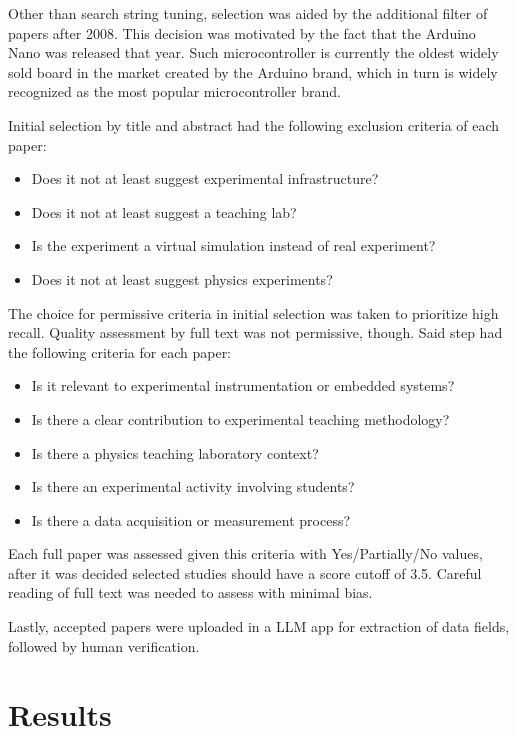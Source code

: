 \documentclass[12pt]{article}
\begin{document}
Other than search string tuning, selection was aided by the additional filter of papers after 2008. This decision was motivated by the fact that the Arduino Nano was released that year. Such microcontroller is currently the oldest widely sold board in the market created by the Arduino brand, which in turn is widely recognized as the most popular microcontroller brand.

Initial selection by title and abstract had the following exclusion criteria of each paper:

\begin{itemize}
  \item Does it not at least suggest experimental infrastructure?
  \item Does it not at least suggest a teaching lab?
  \item Is the experiment a virtual simulation instead of real experiment?
  \item Does it not at least suggest physics experiments?
\end{itemize}

The choice for permissive criteria in initial selection was taken to prioritize high recall.
Quality assessment by full text was not permissive, though. Said step had the following criteria for each paper:

\begin{itemize}
  \item Is it relevant to experimental instrumentation or embedded systems?
  \item Is there a clear contribution to experimental teaching methodology?
  \item Is there a physics teaching laboratory context?
  \item Is there an experimental activity involving students?
  \item Is there a data acquisition or measurement process?
\end{itemize}

Each full paper was assessed given this criteria with Yes/Partially/No values, after it was decided selected studies should have a score cutoff of 3.5. Careful reading of full text was needed to assess with minimal bias.

Lastly, accepted papers were uploaded in a LLM app for extraction of data fields, followed by human verification.

\section{Results}
\end{document}
